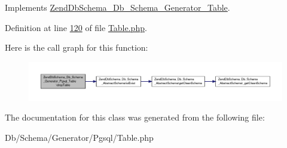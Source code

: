 Implements \hyperlink{interfaceZendDbSchema__Db__Schema__Generator__Table_a6d58bfdd78aff9a8c06739330619f450}{Zend\-Db\-Schema\-\_\-\-Db\-\_\-\-Schema\-\_\-\-Generator\-\_\-\-Table}.



Definition at line \hyperlink{Generator_2Pgsql_2Table_8php_source_l00120}{120} of file \hyperlink{Generator_2Pgsql_2Table_8php_source}{Table.\-php}.



Here is the call graph for this function\-:\nopagebreak
\begin{figure}[H]
\begin{center}
\leavevmode
\includegraphics[width=350pt]{classZendDbSchema__Db__Schema__Generator__Pgsql__Table_abfd240c872df10ff0b021ff86af52641_cgraph}
\end{center}
\end{figure}




The documentation for this class was generated from the following file\-:\begin{DoxyCompactItemize}
\item 
Db/\-Schema/\-Generator/\-Pgsql/Table.\-php\end{DoxyCompactItemize}
